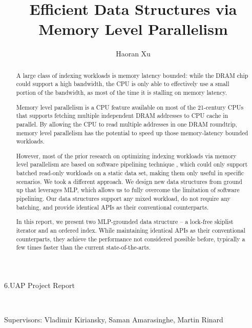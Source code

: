 \documentclass[11pt, usletter]{article}
\begin{document}
\title{Efficient Data Structures via Memory Level Parallelism}
\author{Haoran Xu}
\date{}

\maketitle

\begin{center}

6.UAP Project Report

\

Supervisors: 
Vladimir Kiriansky,
Saman Amarasinghe, 
Martin Rinard

\end{center}

\vspace{1cm}

\begin{abstract}

A large class of indexing workloads is memory latency bounded: 
while the DRAM chip could support a high bandwidth, 
the CPU is only able to effectively use a small portion of the bandwidth, 
as most of the time it is stalling on memory latency.

Memory level parallelism is a CPU feature available on most of the 21-century CPUs 
that supports fetching multiple independent DRAM addresses to CPU cache in parallel. 
By allowing the CPU to read multiple addresses in one DRAM roundtrip,
memory level parallelism has the potential to speed up those memory-latency bounded workloads.

However, most of the prior research on optimizing indexing workloads via memory level parallelism 
are based on software pipelining technique \cite{hashjoin_icde04, fast_sigmod10, amac_vldb15, operatorfusion_vldb17, cimple_pact18}, 
which could only support batched read-only workloads on a static data set, 
making them only useful in specific scenarios. 
We took a different approach. We design new data structures from ground up that leverages MLP, 
which allows us to fully overcome the limitation of software pipelining. 
Our data structures support any mixed workload, do not require any batching, 
and provide identical APIs as their conventional counterparts.

In this report, we present two MLP-grounded data structure -- a lock-free skiplist iterator 
and an ordered index. 
While maintaining identical APIs as their conventional counterparts, 
they achieve the performance not considered possible before, 
typically a few times faster than the current state-of-the-arts. 

\end{abstract}
\end{document}
